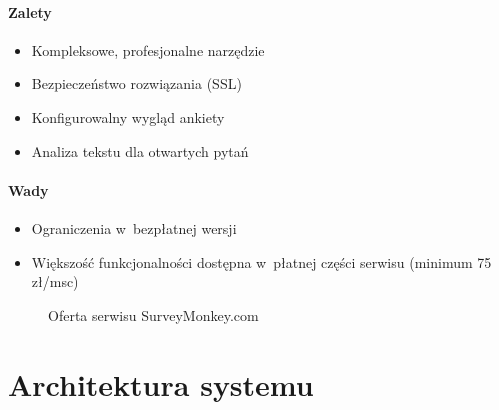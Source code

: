 \documentclass[8pt,a4paper,notitlepage]{article}
\begin{document}
\paragraph{Zalety}
\begin{itemize}
\item Kompleksowe, profesjonalne narzędzie
\item Bezpieczeństwo rozwiązania (SSL)
\item Konfigurowalny wygląd ankiety
\item Analiza tekstu dla otwartych pytań
\end{itemize}

\paragraph{Wady}
\begin{itemize}
\item Ograniczenia w~bezpłatnej wersji
\item Większość funkcjonalności dostępna w~płatnej części serwisu (minimum 75 zł/msc)
\end{itemize}

\begin{figure}[H]
\begin{center}
\caption{Oferta serwisu SurveyMonkey.com}
\end{center}
\end{figure}

\newpage

\section{Architektura systemu}
\end{document}
